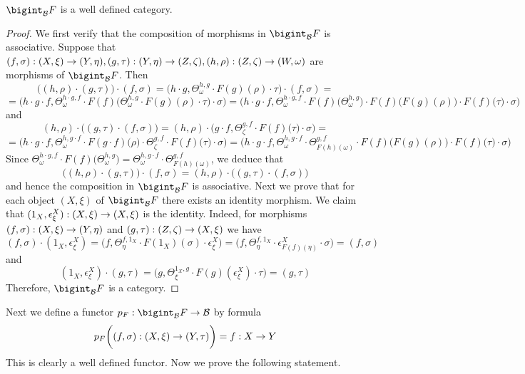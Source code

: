 \begin{fact}
$\bigint_{\cB}F$ is a well defined category.
\end{fact}
\begin{proof}
We first verify that the composition of morphisms in $\bigint_{\cB}F$ is associative. Suppose that $(f,\sigma):(X,\xi)\rightarrow (Y,\eta),(g,\tau):(Y,\eta)\rightarrow (Z,\zeta),(h,\rho):(Z,\zeta)\rightarrow (W,\omega)$ are morphisms of $\bigint_{\cB}F$. Then
$$\big((h,\rho)\cdot (g,\tau)\big)\cdot (f,\sigma) = \big(h\cdot g,\Theta^{h,g}_{\omega}\cdot F(g)\left(\rho\right)\cdot \tau\big)\cdot (f,\sigma) = $$
$$ = \bigg(h\cdot g\cdot f,\Theta^{h\cdot g,f}_{\omega}\cdot F(f)\big(\Theta^{h,g}_{\omega}\cdot F(g)\left(\rho\right)\cdot \tau \big)\cdot \sigma\bigg) = \bigg(h\cdot g\cdot f,\Theta^{h\cdot g,f}_{\omega}\cdot F(f)\big(\Theta^{h,g}_{\omega}\big)\cdot F(f)\big(F(g)\left(\rho\right)\big)\cdot F(f)\big(\tau\big)\cdot \sigma \bigg)$$
and
$$(h,\rho)\cdot \big((g,\tau) \cdot (f,\sigma) \big) = (h, \rho)\cdot \bigg(g\cdot f, \Theta^{g,f}_{\zeta}\cdot F(f)\big(\tau\big)\cdot \sigma\bigg) = $$
$$ = \big(h\cdot g\cdot f, \Theta^{h, g\cdot f}_{\omega}\cdot F(g\cdot f)\big(\rho\big)\cdot \Theta^{g,f}_{\zeta}\cdot F(f)\big(\tau\big)\cdot \sigma \big) = \big(h\cdot g\cdot f, \Theta^{h, g\cdot f}_{\omega}\cdot  \Theta^{g,f}_{F(h)(\omega)} \cdot F(f)\big(F(g)\left(\rho\right)\big)\cdot F(f)\big(\tau\big)\cdot \sigma \big)$$
Since $\Theta^{h\cdot g,f}_{\omega}\cdot F(f)\big(\Theta^{h,g}_{\omega}\big) = \Theta^{h, g\cdot f}_{\omega}\cdot  \Theta^{g,f}_{F(h)(\omega)}$, we deduce that
$$\big((h,\rho)\cdot (g,\tau)\big)\cdot (f,\sigma) = (h,\rho)\cdot \big((g,\tau) \cdot (f,\sigma) \big)$$
and hence the composition in $\bigint_{\cB}F$ is associative. Next we prove that for each object $(X,\xi)$ of $\bigint_{\cB}F$ there exists an identity morphism. We claim that $(1_X,\epsilon^X_{\xi}):(X,\xi)\rightarrow (X,\xi)$ is the identity. Indeed, for morphisms $(f,\sigma):(X,\xi)\rightarrow (Y,\eta)$ and $(g,\tau):(Z,\zeta)\rightarrow (X,\xi)$ we have
$$(f,\sigma) \cdot (1_X,\epsilon^X_{\xi}) = \big(f,\Theta^{f,1_X}_{\eta}\cdot F(1_X)\left(\sigma \right)\cdot \epsilon^X_{\xi}\big) =  \big(f,\Theta^{f,1_X}_{\eta}\cdot \epsilon^X_{F(f)(\eta)}\cdot \sigma\big) = (f,\sigma)$$
and
$$(1_X,\epsilon^X_{\xi}) \cdot (g,\tau) = \big(g,\Theta^{1_X,g}_{\xi} \cdot F(g)\left(\epsilon^X_{\xi}\right)\cdot \tau \big) = (g,\tau)$$
Therefore, $\bigint_{\cB}F$ is a category.
\end{proof}
\noindent
Next we define a functor $p_F:\bigint_{\cB}F\ra \cB$ by formula
$$p_F\bigg((f,\sigma):(X,\xi)\rightarrow (Y,\tau)\bigg) = f:X\rightarrow Y$$
This is clearly a well defined functor. Now we prove the following statement.

